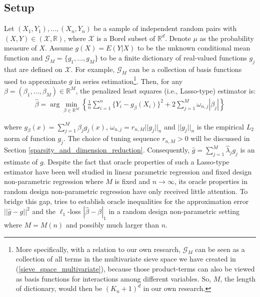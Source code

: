 \documentclass[12pt, a4paper]{article}
\theoremstyle{MAstyle} \newtheorem{assumption}{Assumption}[section]
\theoremstyle{MAstyle} \newtheorem{definition}{Definition}[section]
\theoremstyle{MAstyle} \newtheorem{theorem}{Theorem}[section]
\theoremstyle{MAstyle} \newtheorem{corollary}{Corollary}[section]
\begin{document}
            \subsection{Setup}\label{setup}
                Let $(X_1, Y_1), \ldots, (X_n,Y_n)$ be a sample of independent random pairs with $(X,Y) \in (\mathcal{X},\mathbb{R})$, where $\mathcal{X}$ is a Borel subset of $\mathbb{R}^d$. Denote $\mu$ as the probability measure of $X$. Assume $g(X)=E(Y|X)$ to be the unknown conditional mean function and $\mathcal{G}_M=\{g_1, \ldots,g_M\}$ to be a finite dictionary of real-valued functions $g_j$ that are defined on $\mathcal{X}$. For example, $\mathcal{G}_M$ can be a collection of basis functions used to approximate $g$ in series estimation\footnote{More specifically, with a relation to our own research, $\mathcal{G}_M$ can be seen as a collection of all terms in the multivariate sieve space we have created in (\ref{sieve_space_multivariate}), because those product-terms can also be viewed as basis functions for interactions among different variables. So, $M$, the length of dictionary, would then be $(K_n+1)^d$ in our own research.}. Then, for any $\beta=(\beta_1,\ldots,\beta_M) \in \mathbb{R}^M$, the penalized least squares (i.e., Lasso-type) estimator is:
                \begin{align}\label{lasso-type_estimator}
                    \widehat{\beta}=\arg\min_{\beta \in \mathbb{R}^M}\left\{ \frac{1}{n} \sum\limits_{i=1}^n \{Y_i-g_{\beta}(X_i)\}^2+2\sum_{j=1}^M \omega_{n,j}|\beta_j| \right\}
                \end{align}

                where $g_{\beta}(x)=\sum_{j=1}^M\beta_jg_j(x)$, $\omega_{n,j}=r_{n,M}||g_j||_n$ and $||g_j||_n$ is the empirical $L_2$ norm of function $g_j$. The choice of tuning sequence $r_{n,M}>0$ will be discussed in Section \ref{sparsity_and_dimension_reduction}. Consequently, $\widehat{g}=\sum_{j=1}^M \widehat{\lambda}_jg_j$ is an estimate of $g$. Despite the fact that oracle properties of such a Lasso-type estimator have been well studied in linear parametric regression and fixed design non-parametric regression where $M$ is fixed and $n \to \infty$, its oracle properties in random design non-parametric regression have only received little attention. To bridge this gap, \cite{Bunea_2007} tries to establish oracle inequalities for the approximation error $||\widehat{g}-g||^2$ and the $\ell_1$-loss $|\widehat{\beta}-\beta|_1$ in a random design non-parametric setting where $M=M(n)$ and possibly much larger than $n$.
\end{document}
